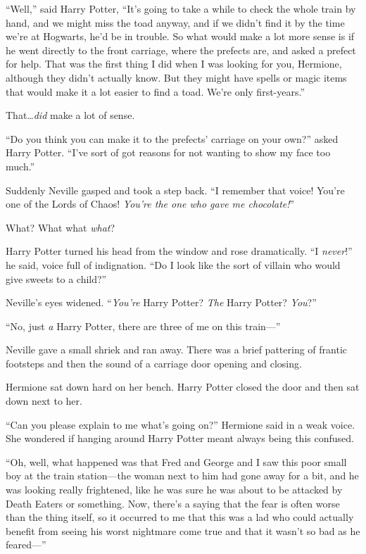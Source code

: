 “Well,” said Harry Potter, “It’s going to take a while to check the whole train by hand, and we might miss the toad anyway, and if we didn’t find it by the time we’re at Hogwarts, he’d be in trouble. So what would make a lot more sense is if he went directly to the front carriage, where the prefects are, and asked a prefect for help. That was the first thing I did when I was looking for you, Hermione, although they didn’t actually know. But they might have spells or magic items that would make it a lot easier to find a toad. We’re only first-years.”

That…\emph{did} make a lot of sense.

“Do you think you can make it to the prefects’ carriage on your own?” asked Harry Potter. “I’ve sort of got reasons for not wanting to show my face too much.”

Suddenly Neville gasped and took a step back. “I remember that voice! You’re one of the Lords of Chaos! \emph{You’re the one who gave me chocolate!}”

What? What what \emph{what}?

Harry Potter turned his head from the window and rose dramatically. “I \emph{never}!” he said, voice full of indignation. “Do I look like the sort of villain who would give sweets to a child?”

Neville’s eyes widened. “\emph{You’re} Harry Potter? \emph{The} Harry Potter? \emph{You}?”

“No, just \emph{a} Harry Potter, there are three of me on this train—”

Neville gave a small shriek and ran away. There was a brief pattering of frantic footsteps and then the sound of a carriage door opening and closing.

Hermione sat down hard on her bench. Harry Potter closed the door and then sat down next to her.

“Can you please explain to me what’s going on?” Hermione said in a weak voice. She wondered if hanging around Harry Potter meant always being this confused.

“Oh, well, what happened was that Fred and George and I saw this poor small boy at the train station—the woman next to him had gone away for a bit, and he was looking really frightened, like he was sure he was about to be attacked by Death Eaters or something. Now, there’s a saying that the fear is often worse than the thing itself, so it occurred to me that this was a lad who could actually benefit from seeing his worst nightmare come true and that it wasn’t so bad as he feared—”

